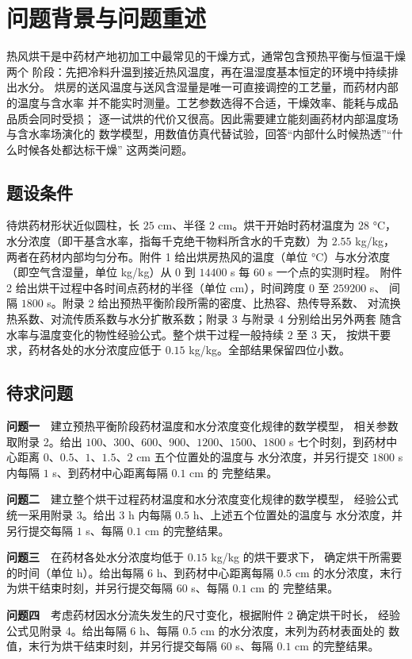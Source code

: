 \section{问题背景与问题重述}

热风烘干是中药材产地初加工中最常见的干燥方式，通常包含预热平衡与恒温干燥两个
阶段：先把冷料升温到接近热风温度，再在温湿度基本恒定的环境中持续排出水分。
烘房的送风温度与送风含湿量是唯一可直接调控的工艺量，而药材内部的温度与含水率
并不能实时测量。工艺参数选得不合适，干燥效率、能耗与成品品质会同时受损；
逐一试烘的代价又很高。因此需要建立能刻画药材内部温度场与含水率场演化的
数学模型，用数值仿真代替试验，回答“内部什么时候热透”“什么时候各处都达标干燥”
这两类问题。

\subsection{题设条件}

待烘药材形状近似圆柱，长 $25$ cm、半径 $2$ cm。烘干开始时药材温度为 $28$ °C，
水分浓度（即干基含水率，指每千克绝干物料所含水的千克数）为 $2.55$ kg/kg，
两者在药材内部均匀分布。附件 1 给出烘房热风的温度（单位 °C）与水分浓度
（即空气含湿量，单位 kg/kg）从 $0$ 到 $14400$ s 每 $60$ s 一个点的实测时程。
附件 2 给出烘干过程中各时间点药材的半径（单位 cm），时间跨度 $0$ 至 $259200$ s、
间隔 $1800$ s。附录 2 给出预热平衡阶段所需的密度、比热容、热传导系数、
对流换热系数、对流传质系数与水分扩散系数；附录 3 与附录 4 分别给出另外两套
随含水率与温度变化的物性经验公式。整个烘干过程一般持续 $2$ 至 $3$ 天，
按烘干要求，药材各处的水分浓度应低于 $0.15$ kg/kg。全部结果保留四位小数。

\subsection{待求问题}

\textbf{问题一}　建立预热平衡阶段药材温度和水分浓度变化规律的数学模型，
相关参数取附录 2。给出 $100$、$300$、$600$、$900$、$1200$、$1500$、$1800$ s
七个时刻，到药材中心距离 $0$、$0.5$、$1$、$1.5$、$2$ cm 五个位置处的温度与
水分浓度，并另行提交 $1800$ s 内每隔 $1$ s、到药材中心距离每隔 $0.1$ cm 的
完整结果。

\textbf{问题二}　建立整个烘干过程药材温度和水分浓度变化规律的数学模型，
经验公式统一采用附录 3。给出 $3$ h 内每隔 $0.5$ h、上述五个位置处的温度与
水分浓度，并另行提交每隔 $1$ s、每隔 $0.1$ cm 的完整结果。

\textbf{问题三}　在药材各处水分浓度均低于 $0.15$ kg/kg 的烘干要求下，
确定烘干所需要的时间（单位 h）。给出每隔 $6$ h、到药材中心距离每隔 $0.5$ cm
的水分浓度，末行为烘干结束时刻，并另行提交每隔 $60$ s、每隔 $0.1$ cm 的
完整结果。

\textbf{问题四}　考虑药材因水分流失发生的尺寸变化，根据附件 2 确定烘干时长，
经验公式见附录 4。给出每隔 $6$ h、每隔 $0.5$ cm 的水分浓度，末列为药材表面处的
数值，末行为烘干结束时刻，并另行提交每隔 $60$ s、每隔 $0.1$ cm 的完整结果。
